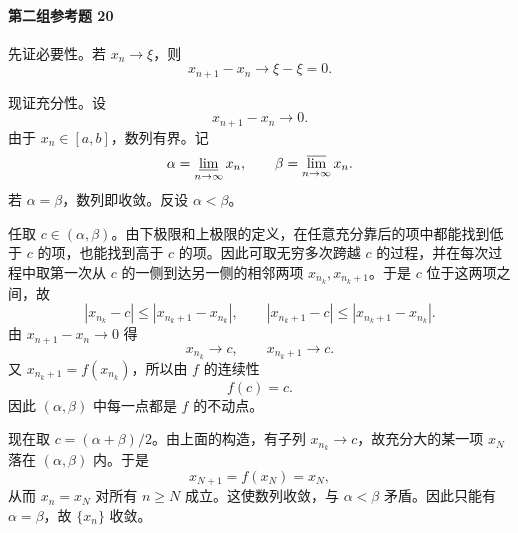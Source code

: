 \paragraph{第二组参考题 20}
\begin{xsolution}
先证必要性。若 $x_n\to\xi$，则
\[
 x_{n+1}-x_n\to\xi-\xi=0.
\]

现证充分性。设
\[
 x_{n+1}-x_n\to0.
\]
由于 $x_n\in[a,b]$，数列有界。记
\[
 \alpha=\varliminf_{n\to\infty}x_n,
 \qquad
 \beta=\varlimsup_{n\to\infty}x_n.
\]
若 $\alpha=\beta$，数列即收敛。反设 $\alpha<\beta$。

任取 $c\in(\alpha,\beta)$。由下极限和上极限的定义，在任意充分靠后的项中都能找到低于 $c$ 的项，也能找到高于 $c$ 的项。因此可取无穷多次跨越 $c$ 的过程，并在每次过程中取第一次从 $c$ 的一侧到达另一侧的相邻两项 $x_{n_k},x_{n_k+1}$。于是 $c$ 位于这两项之间，故
\[
 |x_{n_k}-c|\le |x_{n_k+1}-x_{n_k}|,
 \qquad
 |x_{n_k+1}-c|\le |x_{n_k+1}-x_{n_k}|.
\]
由 $x_{n+1}-x_n\to0$ 得
\[
 x_{n_k}\to c,
 \qquad x_{n_k+1}\to c.
\]
又 $x_{n_k+1}=f(x_{n_k})$，所以由 $f$ 的连续性
\[
 f(c)=c.
\]
因此 $(\alpha,\beta)$ 中每一点都是 $f$ 的不动点。

现在取 $c=(\alpha+\beta)/2$。由上面的构造，有子列 $x_{n_k}\to c$，故充分大的某一项 $x_N$ 落在 $(\alpha,\beta)$ 内。于是
\[
 x_{N+1}=f(x_N)=x_N,
\]
从而 $x_n=x_N$ 对所有 $n\ge N$ 成立。这使数列收敛，与 $\alpha<\beta$ 矛盾。因此只能有 $\alpha=\beta$，故 $\{x_n\}$ 收敛。
\end{xsolution}
